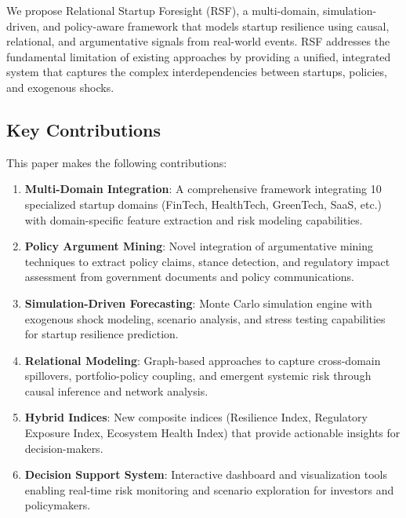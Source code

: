 \documentclass[conference]{IEEEtran}
\begin{document}
We propose Relational Startup Foresight (RSF), a multi-domain, simulation-driven, and policy-aware framework that models startup resilience using causal, relational, and argumentative signals from real-world events. RSF addresses the fundamental limitation of existing approaches by providing a unified, integrated system that captures the complex interdependencies between startups, policies, and exogenous shocks.

\subsection{Key Contributions}

This paper makes the following contributions:

\begin{enumerate}
    \item \textbf{Multi-Domain Integration}: A comprehensive framework integrating 10 specialized startup domains (FinTech, HealthTech, GreenTech, SaaS, etc.) with domain-specific feature extraction and risk modeling capabilities.
    
    \item \textbf{Policy Argument Mining}: Novel integration of argumentative mining techniques to extract policy claims, stance detection, and regulatory impact assessment from government documents and policy communications.
    
    \item \textbf{Simulation-Driven Forecasting}: Monte Carlo simulation engine with exogenous shock modeling, scenario analysis, and stress testing capabilities for startup resilience prediction.
    
    \item \textbf{Relational Modeling}: Graph-based approaches to capture cross-domain spillovers, portfolio-policy coupling, and emergent systemic risk through causal inference and network analysis.
    
    \item \textbf{Hybrid Indices}: New composite indices (Resilience Index, Regulatory Exposure Index, Ecosystem Health Index) that provide actionable insights for decision-makers.
    
    \item \textbf{Decision Support System}: Interactive dashboard and visualization tools enabling real-time risk monitoring and scenario exploration for investors and policymakers.
\end{enumerate}
\end{document}
